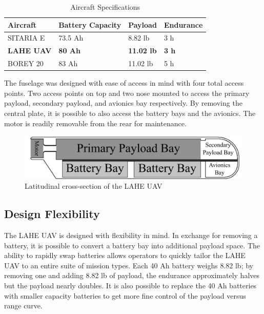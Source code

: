 \documentclass[12pt]{article}
\begin{document}
	\begin{table}[h]
		\centering
		\caption{Aircraft Specifications}
		\begin{tabular}{|l|l|l|l|}
			\hline
			\textbf{Aircraft} & \textbf{Battery Capacity} & \textbf{Payload} & \textbf{Endurance} \\ 
			\hline
			SITARIA E & 73.5 Ah & 8.82 lb & 3 h \\ 
			\hline
			\textbf{LAHE UAV} & \textbf{80 Ah} & \textbf{11.02 lb} & \textbf{3 h} \\ 
			\hline
			BOREY 20 & 83 Ah & 11.02 lb & 5 h \\ 
			\hline
		\end{tabular}
	\end{table}
	
	The fuselage was designed with ease of access in mind with four total access points. Two access points on top and two nose mounted to access the primary payload, secondary payload, and avionics bay respectively.  By removing the central plate, it is possible to also access the battery bays and the avionics. The motor is readily removable from the rear for maintenance.
	
	\begin{figure}[h!]
		\centering
		\includegraphics[width=6 in]{Media/SideCrossSection.png} %
		\caption{Latitudinal cross-section of the LAHE UAV}
		\label{fig:side_cross_section}
	\end{figure}
	
	\subsection{Design Flexibility}
	The LAHE UAV is designed with flexibility in mind. In exchange for removing a battery, it is possible to convert a battery bay into additional payload space. The ability to rapidly swap batteries allows operators to quickly tailor the LAHE UAV to an entire suite of mission types. Each 40 Ah battery weighs 8.82 lb; by removing one and adding 8.82 lb of payload, the endurance approximately halves but the payload nearly doubles. It is also possible to replace the 40 Ah batteries with smaller capacity batteries to get more fine control of the payload versus range curve. 
	
\end{document}
